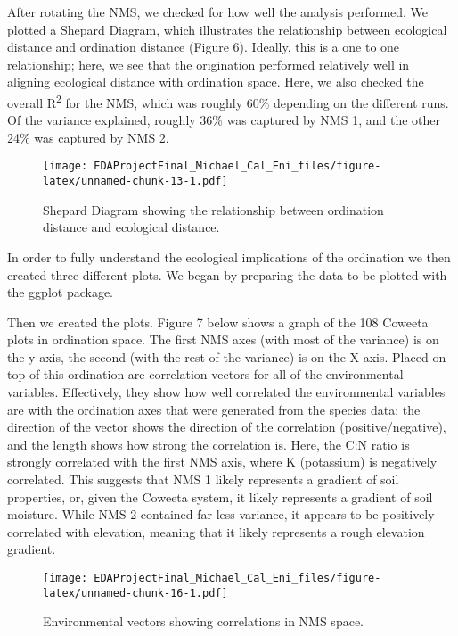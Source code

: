 \documentclass[
  12pt,
]{article}
\begin{document}
After rotating the NMS, we checked for how well the analysis performed.
We plotted a Shepard Diagram, which illustrates the relationship between
ecological distance and ordination distance (Figure 6). Ideally, this is
a one to one relationship; here, we see that the origination performed
relatively well in aligning ecological distance with ordination space.
Here, we also checked the overall R\textsuperscript{2} for the NMS,
which was roughly 60\% depending on the different runs. Of the variance
explained, roughly 36\% was captured by NMS 1, and the other 24\% was
captured by NMS 2.

\begin{figure}
\centering
\texttt{[image: EDAProjectFinal\_Michael\_Cal\_Eni\_files/figure-latex/unnamed-chunk-13-1.pdf]}
\caption{Shepard Diagram showing the relationship between ordination
distance and ecological distance.}
\end{figure}

\newpage

In order to fully understand the ecological implications of the
ordination we then created three different plots. We began by preparing
the data to be plotted with the ggplot package.

Then we created the plots. Figure 7 below shows a graph of the 108
Coweeta plots in ordination space. The first NMS axes (with most of the
variance) is on the y-axis, the second (with the rest of the variance)
is on the X axis. Placed on top of this ordination are correlation
vectors for all of the environmental variables. Effectively, they show
how well correlated the environmental variables are with the ordination
axes that were generated from the species data: the direction of the
vector shows the direction of the correlation (positive/negative), and
the length shows how strong the correlation is. Here, the C:N ratio is
strongly correlated with the first NMS axis, where K (potassium) is
negatively correlated. This suggests that NMS 1 likely represents a
gradient of soil properties, or, given the Coweeta system, it likely
represents a gradient of soil moisture. While NMS 2 contained far less
variance, it appears to be positively correlated with elevation, meaning
that it likely represents a rough elevation gradient.

\begin{figure}
\centering
\texttt{[image: EDAProjectFinal\_Michael\_Cal\_Eni\_files/figure-latex/unnamed-chunk-16-1.pdf]}
\caption{Environmental vectors showing correlations in NMS space.}
\end{figure}
\end{document}
